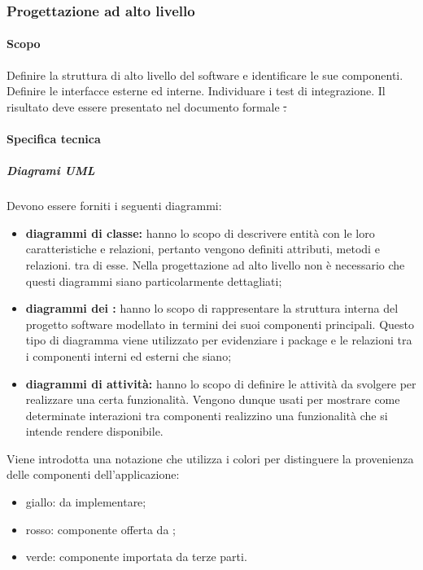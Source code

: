             \subsubsection{Progettazione ad alto livello}
                \paragraph{Scopo}
                Definire la struttura di alto livello del software e identificare le sue componenti. Definire le interfacce esterne ed interne. Individuare i test di integrazione. Il risultato deve essere presentato nel documento formale \st.
                \paragraph{Specifica tecnica}
                \subparagraph{Diagrami UML}
                Devono essere forniti i seguenti diagrammi:
                \begin{itemize}
                    \item \textbf{diagrammi di classe:} hanno lo scopo di descrivere entità con le loro caratteristiche e relazioni, pertanto vengono definiti attributi, metodi e relazioni. tra di esse. Nella progettazione ad alto livello non è necessario che questi diagrammi siano particolarmente dettagliati;
                    \item \textbf{diagrammi dei :} hanno lo scopo di rappresentare la struttura interna del progetto software modellato in termini dei suoi componenti principali. Questo tipo di diagramma viene utilizzato per evidenziare i package e le relazioni tra i componenti interni ed esterni che siano;
                    \item \textbf{diagrammi di attività:} hanno lo scopo di definire le attività da svolgere per realizzare una certa funzionalità. Vengono dunque usati per mostrare come determinate interazioni tra componenti realizzino una funzionalità che si intende rendere disponibile.
                \end{itemize}
	            Viene introdotta una notazione che utilizza i colori per distinguere la provenienza delle componenti dell'applicazione:
	            \begin{itemize}
	            	\item giallo:  da implementare;
	            	\item rosso: componente offerta da \riskapp;
	            	\item verde: componente importata da terze parti.
	            \end{itemize}
